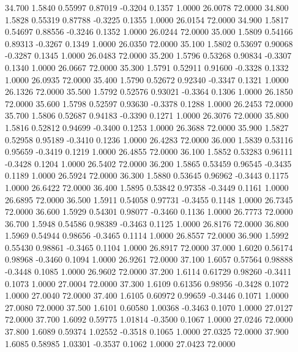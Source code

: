   34.700   1.5840   0.55997   0.87019  -0.3204   0.1357   1.0000  26.0078  72.0000
  34.800   1.5828   0.55319   0.87788  -0.3225   0.1355   1.0000  26.0154  72.0000
  34.900   1.5817   0.54697   0.88556  -0.3246   0.1352   1.0000  26.0244  72.0000
  35.000   1.5809   0.54166   0.89313  -0.3267   0.1349   1.0000  26.0350  72.0000
  35.100   1.5802   0.53697   0.90068  -0.3287   0.1345   1.0000  26.0483  72.0000
  35.200   1.5796   0.53268   0.90834  -0.3307   0.1340   1.0000  26.0667  72.0000
  35.300   1.5791   0.52911   0.91600  -0.3328   0.1332   1.0000  26.0935  72.0000
  35.400   1.5790   0.52672   0.92340  -0.3347   0.1321   1.0000  26.1326  72.0000
  35.500   1.5792   0.52576   0.93021  -0.3364   0.1306   1.0000  26.1850  72.0000
  35.600   1.5798   0.52597   0.93630  -0.3378   0.1288   1.0000  26.2453  72.0000
  35.700   1.5806   0.52687   0.94183  -0.3390   0.1271   1.0000  26.3076  72.0000
  35.800   1.5816   0.52812   0.94699  -0.3400   0.1253   1.0000  26.3688  72.0000
  35.900   1.5827   0.52958   0.95189  -0.3410   0.1236   1.0000  26.4283  72.0000
  36.000   1.5839   0.53116   0.95659  -0.3419   0.1219   1.0000  26.4855  72.0000
  36.100   1.5852   0.53283   0.96111  -0.3428   0.1204   1.0000  26.5402  72.0000
  36.200   1.5865   0.53459   0.96545  -0.3435   0.1189   1.0000  26.5924  72.0000
  36.300   1.5880   0.53645   0.96962  -0.3443   0.1175   1.0000  26.6422  72.0000
  36.400   1.5895   0.53842   0.97358  -0.3449   0.1161   1.0000  26.6895  72.0000
  36.500   1.5911   0.54058   0.97731  -0.3455   0.1148   1.0000  26.7345  72.0000
  36.600   1.5929   0.54301   0.98077  -0.3460   0.1136   1.0000  26.7773  72.0000
  36.700   1.5948   0.54586   0.98389  -0.3463   0.1125   1.0000  26.8176  72.0000
  36.800   1.5969   0.54944   0.98656  -0.3465   0.1114   1.0000  26.8557  72.0000
  36.900   1.5992   0.55430   0.98861  -0.3465   0.1104   1.0000  26.8917  72.0000
  37.000   1.6020   0.56174   0.98968  -0.3460   0.1094   1.0000  26.9261  72.0000
  37.100   1.6057   0.57564   0.98888  -0.3448   0.1085   1.0000  26.9602  72.0000
  37.200   1.6114   0.61729   0.98260  -0.3411   0.1073   1.0000  27.0004  72.0000
  37.300   1.6109   0.61356   0.98956  -0.3428   0.1072   1.0000  27.0040  72.0000
  37.400   1.6105   0.60972   0.99659  -0.3446   0.1071   1.0000  27.0080  72.0000
  37.500   1.6101   0.60580   1.00368  -0.3463   0.1070   1.0000  27.0127  72.0000
  37.700   1.6092   0.59775   1.01814  -0.3500   0.1067   1.0000  27.0246  72.0000
  37.800   1.6089   0.59374   1.02552  -0.3518   0.1065   1.0000  27.0325  72.0000
  37.900   1.6085   0.58985   1.03301  -0.3537   0.1062   1.0000  27.0423  72.0000
